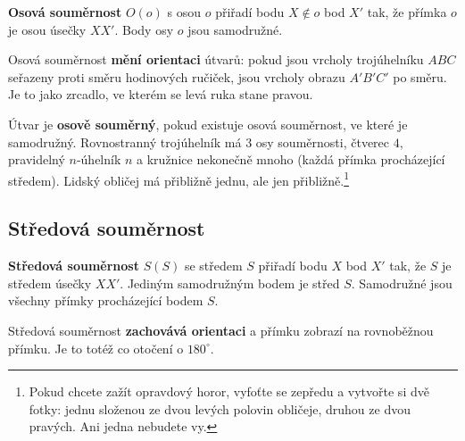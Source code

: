 \begin{definitionbox}
  \textbf{Osová souměrnost} $O(o)$ s osou $o$ přiřadí bodu $X\notin o$ bod $X'$ tak, že přímka $o$ je osou úsečky $XX'$. Body osy $o$ jsou samodružné.

  \vspace{0.2cm}

  Osová souměrnost \textbf{mění orientaci} útvarů: pokud jsou vrcholy trojúhelníku $ABC$ seřazeny proti směru hodinových ručiček, jsou vrcholy obrazu $A'B'C'$ po směru. Je to jako zrcadlo, ve kterém se levá ruka stane pravou.
\end{definitionbox}

\begin{center}
\end{center}

Útvar je \textbf{osově souměrný}, pokud existuje osová souměrnost, ve které je samodružný. Rovnostranný trojúhelník má $3$ osy souměrnosti, čtverec $4$, pravidelný $n$-úhelník $n$ a kružnice nekonečně mnoho (každá přímka procházející středem). Lidský obličej má přibližně jednu, ale jen přibližně.\footnote{Pokud chcete zažít opravdový horor, vyfoťte se zepředu a vytvořte si dvě fotky: jednu složenou ze dvou levých polovin obličeje, druhou ze dvou pravých. Ani jedna nebudete vy.}

\subsection{Středová souměrnost}

\begin{definitionbox}
  \textbf{Středová souměrnost} $S(S)$ se středem $S$ přiřadí bodu $X$ bod $X'$ tak, že $S$ je středem úsečky $XX'$. Jediným samodružným bodem je střed $S$. Samodružné jsou všechny přímky procházející bodem $S$.

  \vspace{0.2cm}

  Středová souměrnost \textbf{zachovává orientaci} a přímku zobrazí na rovnoběžnou přímku. Je to totéž co otočení o $180^\circ$.
\end{definitionbox}

